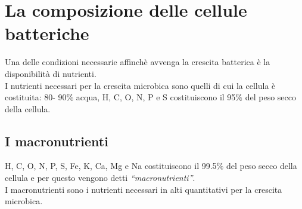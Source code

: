 \documentclass[11pt]{book}
\begin{document}
\section{La composizione delle cellule batteriche}
Una delle condizioni necessarie affinchè avvenga la crescita batterica è la disponibilità di nutrienti.\\
I nutrienti necessari per la crescita microbica sono quelli di cui la cellula è costituita: 80- 90$\%$ acqua, H, C, O, N, P e S costituiscono il 95$\%$ del peso secco della cellula.

\subsection{I macronutrienti}
H, C, O, N, P, S, Fe, K, Ca, Mg e Na costituiscono il 99.5$\%$  del peso secco della cellula e per questo vengono detti \emph{``macronutrienti''}.\\
I macronutrienti sono i nutrienti necessari in alti quantitativi per la crescita microbica.
\end{document}
